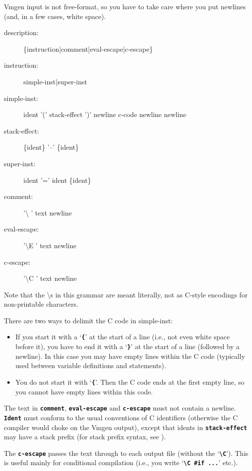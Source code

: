 \documentclass[10pt,english]{article}
\begin{document}
Vmgen input is not free-format, so you have to take care where you
put newlines (and, in a few cases, white space).
\begin{description}
\item [{description:}] \{instruction|comment|eval-escape|c-escape\}
\item [{instruction:}] simple-inst|super-inst
\item [{simple-inst:}] ident '(' stack-effect ')' newline c-code newline
newline
\item [{stack-effect:}] \{ident\} '--' \{ident\}
\item [{super-inst:}] ident '=' ident \{ident\}
\item [{comment:}] '\textbackslash{} ' text newline
\item [{eval-escape:}] '\textbackslash{}E ' text newline
\item [{c-escape:}] '\textbackslash{}C ' text newline
\end{description}
Note that the \textbackslash{}s in this grammar are meant literally,
not as C-style encodings for non-printable characters.

There are two ways to delimit the C code in simple-inst:
\begin{itemize}
\item If you start it with a \textquoteleft{}\texttt{\textbf{\{}}\textquoteright{}
at the start of a line (i.e., not even white space before it), you
have to end it with a \textquoteleft{}\texttt{\textbf{\}}}\textquoteright{}
at the start of a line (followed by a newline). In this case you may
have empty lines within the C code (typically used between variable
definitions and statements).
\item You do not start it with \textquoteleft{}\texttt{\textbf{\{}}\textquoteright{}.
Then the C code ends at the first empty line, so you cannot have empty
lines within this code.
\end{itemize}
The text in \texttt{\textbf{comment}}, \texttt{\textbf{eval-escape}}
and \texttt{\textbf{c-escape}} must not contain a newline. \texttt{\textbf{Ident}}
must conform to the usual conventions of C identifiers (otherwise
the C compiler would choke on the Vmgen output), except that idents
in \texttt{\textbf{stack-effect}} may have a stack prefix (for stack
prefix syntax, see ).

The \texttt{\textbf{c-escape}} passes the text through to each output
file (without the \textquoteleft{}\texttt{\textbf{\textbackslash{}C}}\textquoteright{}).
This is useful mainly for conditional compilation (i.e., you write
\textquoteleft{}\texttt{\textbf{\textbackslash{}C \#if ...}}\textquoteright{}
etc.).
\end{document}
